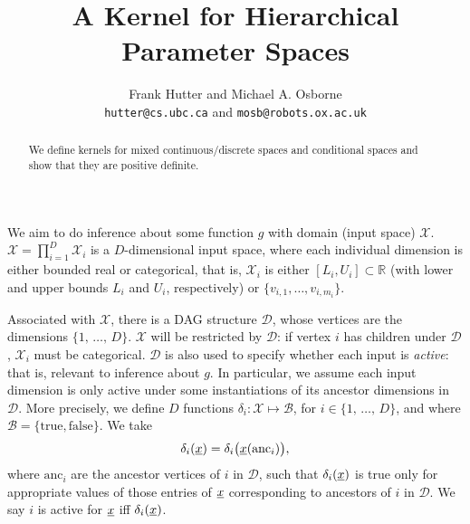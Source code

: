 \documentclass[letterpaper]{article}
\newcommand{\vect}[1]{\underline{\smash{#1}}}
\renewcommand{\v}[1]{\vect{#1}}
\newcommand{\reals}{\mathds{R}}
\newcommand{\sX}{\mathcal{X}}
\newcommand{\sD}{\mathcal{D}}
\begin{document}
\title{A Kernel for Hierarchical Parameter Spaces}

\author{Frank Hutter and Michael A. Osborne\\
{\tt hutter@cs.ubc.ca} and {\tt mosb@robots.ox.ac.uk}
}

\maketitle
\begin{abstract}
\noindent{}We define kernels for mixed continuous/discrete spaces and conditional spaces and show that they are positive definite.
\end{abstract}

We aim to do inference about some function $g$ with domain (input space) $\sX$. $\sX = \prod_{i=1}^D \sX_i$ is a $D$-dimensional input space, where each individual dimension is either bounded real or categorical, that is, $\sX_i$ is either $[L_i, U_i] \subset \reals$ (with lower and upper bounds $L_i$ and $U_i$, respectively) or $\{v_{i,1}, \dots, v_{i,m_i}\}$. 

Associated with $\sX$, there is a DAG structure $\sD$, whose vertices are the dimensions $\{1,\,\ldots,\,D\}$. $\sX$ will be restricted by $\sD$: if vertex $i$ has children under $\sD$, $\sX_i$ must be categorical. $\sD$ is also used to specify whether each input is \emph{active}: that is, relevant to inference about $g$. In particular, we assume each input dimension is only active under some instantiations of its ancestor dimensions in $\sD$. More precisely, we define $D$ functions $\delta_i\colon \sX\mapsto \mathcal{B}$, for $i \in \{1,\,\ldots,\,D\}$, and where $\mathcal{B} = \{\text{true}, \text{false}\}$. We take 
\begin{equation}
 \delta_i(\v{x}) = \delta_i\bigl(\v{x}(\text{anc}_i)\bigr),
\end{equation}
where $\text{anc}_i$ are the ancestor vertices of $i$ in $\sD$, such that $\delta_i(\v{x})$ is true only for appropriate values of those entries of $\v{x}$ corresponding to ancestors of $i$ in $\sD$. We say $i$ is active for $\v{x}$ iff $\delta_i(\v{x})$.
\end{document}
